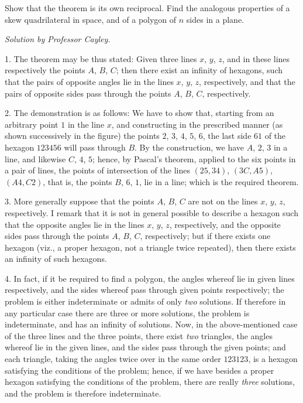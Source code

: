 \documentclass[11pt,a4paper]{article}
\begin{document}
Show that the theorem is its own reciprocal. Find the analogous properties of a
skew quadrilateral in space, and of a polygon of $n$ sides in a plane.

\begin{center}
\textit{Solution by Professor Cayley.}
\end{center}

1. The theorem may be thus stated: Given three lines $x$, $y$, $z$, and in these lines
respectively the points $A$, $B$, $C$; then there exist an infinity of hexagons, such that
the pairs of opposite angles lie in the lines $x$, $y$, $z$, respectively, and that the pairs
of opposite sides pass through the points $A$, $B$, $C$, respectively.

2. The demonstration is as follows: We have to show that, starting from an
arbitrary point $1$ in the line $x$, and constructing in the prescribed manner (as shown
successively in the figure) the points $2$, $3$, $4$, $5$, $6$, the last side $61$ of the hexagon
$123456$ will pass through $B$. By the construction, we have $A$, $2$, $3$ in a line, and
likewise $C$, $4$, $5$; hence, by Pascal's theorem, applied to the six points in a pair of
lines, the points of intersection of the lines $(25, 34)$, $(3C, A5)$, $(A4, C2)$, that is, the
points $B$, $6$, $1$, lie in a line; which is the required theorem.

3. More generally suppose that the points $A$, $B$, $C$ are not on the lines $x$, $y$, $z$,
respectively. I remark that it is not in general possible to describe a hexagon such
that the opposite angles lie in the lines $x$, $y$, $z$, respectively, and the opposite sides
pass through the points $A$, $B$, $C$, respectively; but if there exists one hexagon (viz.,
a proper hexagon, not a triangle twice repeated), then there exists an infinity of such
hexagons.

4. In fact, if it be required to find a polygon, the angles whereof lie in given
lines respectively, and the sides whereof pass through given points respectively; the
problem is either indeterminate or admits of only \textit{two} solutions. If therefore in any
particular case there are three or more solutions, the problem is indeterminate, and
has an infinity of solutions. Now, in the above-mentioned case of the three lines
and the three points, there exist \textit{two} triangles, the angles whereof lie in the given
lines, and the sides pass through the given points; and each triangle, taking the
angles twice over in the same order $123123$, is a hexagon satisfying the conditions of
the problem; hence, if we have besides a proper hexagon satisfying the conditions of
the problem, there are really \textit{three} solutions, and the problem is therefore indeterminate.
\end{document}
